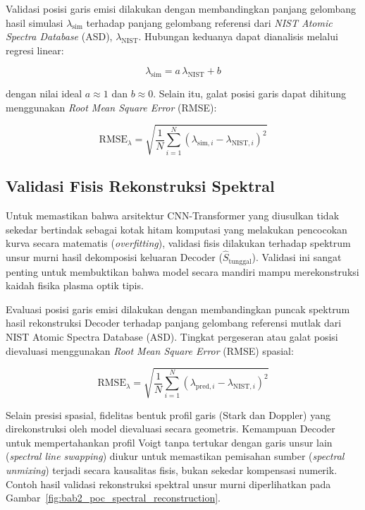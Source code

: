 Validasi posisi garis emisi dilakukan dengan membandingkan panjang gelombang hasil simulasi $\lambda_{\mathrm{sim}}$ terhadap panjang gelombang referensi dari \textit{NIST Atomic Spectra Database} (ASD), $\lambda_{\mathrm{NIST}}$. Hubungan keduanya dapat dianalisis melalui regresi linear:

\begin{equation}
\lambda_{\mathrm{sim}} = a\,\lambda_{\mathrm{NIST}} + b
\end{equation}

dengan nilai ideal $a \approx 1$ dan $b \approx 0$. Selain itu, galat posisi garis dapat dihitung menggunakan \textit{Root Mean Square Error} (RMSE):

\begin{equation}
\mathrm{RMSE}_{\lambda} =
\sqrt{\frac{1}{N}\sum_{i=1}^{N}
(\lambda_{\mathrm{sim},i}-\lambda_{\mathrm{NIST},i})^2}
\end{equation}

\subsection{Validasi Fisis Rekonstruksi Spektral}
\label{subsec:bab2_validasi_rekonstruksi}

Untuk memastikan bahwa arsitektur CNN-Transformer yang diusulkan tidak sekedar bertindak sebagai kotak hitam komputasi yang melakukan pencocokan kurva secara matematis (\textit{overfitting}), validasi fisis dilakukan terhadap spektrum unsur murni hasil dekomposisi keluaran Decoder ($\hat{S}_{\mathrm{tunggal}}$). Validasi ini sangat penting untuk membuktikan bahwa model secara mandiri mampu merekonstruksi kaidah fisika plasma optik tipis.

Evaluasi posisi garis emisi dilakukan dengan membandingkan puncak spektrum hasil rekonstruksi Decoder terhadap panjang gelombang referensi mutlak dari NIST Atomic Spectra Database (ASD). Tingkat pergeseran atau galat posisi dievaluasi menggunakan \textit{Root Mean Square Error} (RMSE) spasial:

\begin{equation}
\mathrm{RMSE}_{\lambda} = \sqrt{ \frac{1}{N} \sum_{i=1}^{N} (\lambda_{\mathrm{pred},i} - \lambda_{\mathrm{NIST},i})^2 }
\end{equation}

Selain presisi spasial, fidelitas bentuk profil garis (Stark dan Doppler) yang direkonstruksi oleh model dievaluasi secara geometris. Kemampuan Decoder untuk mempertahankan profil Voigt tanpa tertukar dengan garis unsur lain (\textit{spectral line swapping}) diukur untuk memastikan pemisahan sumber (\textit{spectral unmixing}) terjadi secara kausalitas fisis, bukan sekedar kompensasi numerik. Contoh hasil validasi rekonstruksi spektral unsur murni diperlihatkan pada Gambar~\ref{fig:bab2_poc_spectral_reconstruction}.


